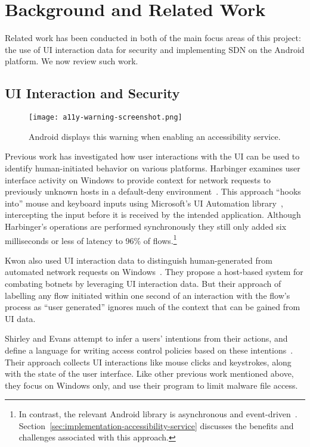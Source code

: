 \section{Background and Related Work}
\label{sec:related-work}

Related work has been conducted in both of the main focus areas of this project:
the use of UI interaction data for security and implementing SDN on the Android
platform. We now review such work.

\subsection{UI Interaction and Security}
\label{sec:ui-interaction-and-security}

\begin{wrapfigure}{R}{0.4\textwidth}
	\centering
	\texttt{[image: a11y-warning-screenshot.png]}
	\caption{Android displays this warning when enabling an accessibility
		service.}
	\label{fig:a11y-warning}
\end{wrapfigure}

Previous work has investigated how user interactions with the UI can be used to
identify human-initiated behavior on various platforms. Harbinger examines user
interface activity on Windows to provide context for network requests to
previously unknown hosts in a default-deny environment~\cite{chuluundorj2019}.
This approach ``hooks into'' mouse and keyboard inputs using Microsoft's UI
Automation library~\cite{microsoft2018}, intercepting the input before it is
received by the intended application. Although Harbinger's operations are
performed synchronously they still only added six milliseconds or less of
latency to 96\% of flows.\footnote{In contrast, the relevant Android library is
	asynchronous and event-driven~\cite{googledevelopers2020}.
	Section~\ref{sec:implementation-accessibility-service} discusses the
	benefits and challenges associated with this approach.}

Kwon \etal also used UI interaction data to distinguish human-generated from
automated network requests on Windows~\cite{kwon2011}. They propose a host-based
system for combating botnets by leveraging UI interaction data. But their
approach of labelling any flow initiated within one second of an interaction
with the flow's process as ``user generated'' ignores much of the context that
can be gained from UI data.

Shirley and Evans attempt to infer a users' intentions from their actions, and
define a language for writing access control policies based on these
intentions~\cite{shirley2008}. Their approach collects UI interactions like
mouse clicks and keystrokes, along with the state of the user interface. Like
other previous work mentioned above, they focus on Windows only, and use their
program to limit malware file access.

